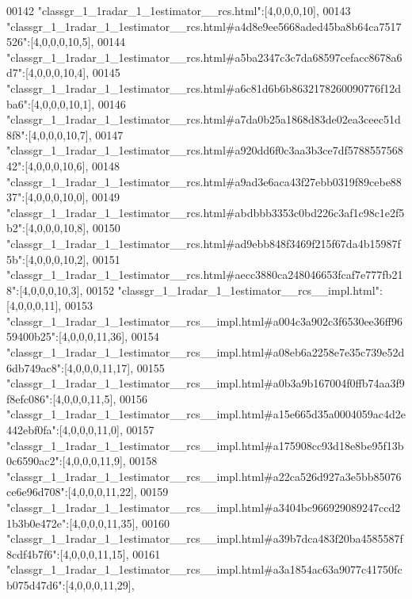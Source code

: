\begin{DoxyCode}
00142 \textcolor{stringliteral}{"classgr\_1\_1radar\_1\_1estimator\_\_rcs.html"}:[4,0,0,0,10],
00143 \textcolor{stringliteral}{"classgr\_1\_1radar\_1\_1estimator\_\_rcs.html#a4d8e9ee5668aded45ba8b64ca7517526"}:[4,0,0,0,10,5],
00144 \textcolor{stringliteral}{"classgr\_1\_1radar\_1\_1estimator\_\_rcs.html#a5ba2347c3c7da68597cefacc8678a6d7"}:[4,0,0,0,10,4],
00145 \textcolor{stringliteral}{"classgr\_1\_1radar\_1\_1estimator\_\_rcs.html#a6c81d6b6b8632178260090776f12dba6"}:[4,0,0,0,10,1],
00146 \textcolor{stringliteral}{"classgr\_1\_1radar\_1\_1estimator\_\_rcs.html#a7da0b25a1868d83de02ea3ceec51d8f8"}:[4,0,0,0,10,7],
00147 \textcolor{stringliteral}{"classgr\_1\_1radar\_1\_1estimator\_\_rcs.html#a920dd6f0c3aa3b3ce7df578855756842"}:[4,0,0,0,10,6],
00148 \textcolor{stringliteral}{"classgr\_1\_1radar\_1\_1estimator\_\_rcs.html#a9ad3e6aca43f27ebb0319f89cebe8837"}:[4,0,0,0,10,0],
00149 \textcolor{stringliteral}{"classgr\_1\_1radar\_1\_1estimator\_\_rcs.html#abdbbb3353c0bd226c3af1c98c1e2f5b2"}:[4,0,0,0,10,8],
00150 \textcolor{stringliteral}{"classgr\_1\_1radar\_1\_1estimator\_\_rcs.html#ad9ebb848f3469f215f67da4b15987f5b"}:[4,0,0,0,10,2],
00151 \textcolor{stringliteral}{"classgr\_1\_1radar\_1\_1estimator\_\_rcs.html#aecc3880ca248046653fcaf7e777fb218"}:[4,0,0,0,10,3],
00152 \textcolor{stringliteral}{"classgr\_1\_1radar\_1\_1estimator\_\_rcs\_\_impl.html"}:[4,0,0,0,11],
00153 \textcolor{stringliteral}{"classgr\_1\_1radar\_1\_1estimator\_\_rcs\_\_impl.html#a004c3a902c3f6530ee36ff9659400b25"}:[4,0,0,0,11,36],
00154 \textcolor{stringliteral}{"classgr\_1\_1radar\_1\_1estimator\_\_rcs\_\_impl.html#a08eb6a2258e7e35c739e52d6db749ac8"}:[4,0,0,0,11,17],
00155 \textcolor{stringliteral}{"classgr\_1\_1radar\_1\_1estimator\_\_rcs\_\_impl.html#a0b3a9b167004f0ffb74aa3f9f8efc086"}:[4,0,0,0,11,5],
00156 \textcolor{stringliteral}{"classgr\_1\_1radar\_1\_1estimator\_\_rcs\_\_impl.html#a15e665d35a0004059ac4d2e442ebf0fa"}:[4,0,0,0,11,0],
00157 \textcolor{stringliteral}{"classgr\_1\_1radar\_1\_1estimator\_\_rcs\_\_impl.html#a175908cc93d18e8be95f13b0c6590ac2"}:[4,0,0,0,11,9],
00158 \textcolor{stringliteral}{"classgr\_1\_1radar\_1\_1estimator\_\_rcs\_\_impl.html#a22ca526d927a3e5bb85076ce6e96d708"}:[4,0,0,0,11,22],
00159 \textcolor{stringliteral}{"classgr\_1\_1radar\_1\_1estimator\_\_rcs\_\_impl.html#a3404bc966929089247ccd21b3b0e472e"}:[4,0,0,0,11,35],
00160 \textcolor{stringliteral}{"classgr\_1\_1radar\_1\_1estimator\_\_rcs\_\_impl.html#a39b7dca483f20ba4585587f8cdf4b7f6"}:[4,0,0,0,11,15],
00161 \textcolor{stringliteral}{"classgr\_1\_1radar\_1\_1estimator\_\_rcs\_\_impl.html#a3a1854ac63a9077c41750fcb075d47d6"}:[4,0,0,0,11,29],

\end{DoxyCode}

